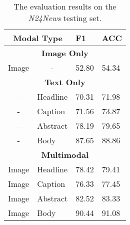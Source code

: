 \documentclass[10pt, a4paper]{article}
\begin{document}
\begin{table}[]
\centering
\begin{tabular}{llll}
\toprule
\multicolumn{2}{c}{\textbf{Modal Type}} & \textbf{F1} & \textbf{ACC} \\\hline
\multicolumn{4}{c}{\textbf{Image Only}}                               \\\hline
Image                 & \multicolumn{1}{c}{-} &  52.80  & 54.34 \\\hline
\multicolumn{4}{c}{\textbf{Text Only}}                               \\\hline
\multicolumn{1}{c}{-} & Headline              &  70.31  & 71.98    \\
\multicolumn{1}{c}{-} & Caption               &  71.56  & 73.87    \\
\multicolumn{1}{c}{-} & Abstract              &  78.19  & 79.65    \\
\multicolumn{1}{c}{-} & Body               &  87.65  & 88.86    \\\hline
\multicolumn{4}{c}{\textbf{Multimodal}}                               \\\hline
Image                 & Headline              &  78.42  & 79.41    \\
Image                 & Caption               &  76.33  & 77.45    \\
Image                 & Abstract              &  82.52  & 83.33    \\
Image                 & Body               &  90.44  &  91.08   \\
\bottomrule
\end{tabular}
\caption{The evaluation results on the \textit{N24News} testing set.}
\label{tab:experiments}
\end{table}
\end{document}
